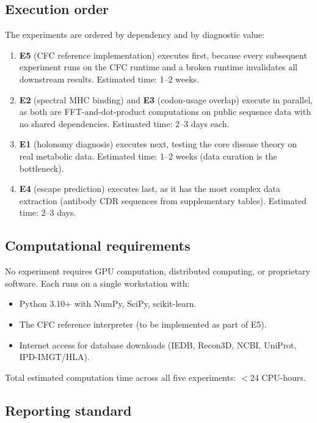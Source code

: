 \documentclass[11pt,a4paper]{article}
\theoremstyle{expthm}
\theoremstyle{definition}
\theoremstyle{remark}
\begin{document}
\subsection{Execution order}

The experiments are ordered by dependency and by diagnostic value:

\begin{enumerate}[leftmargin=1.4em,itemsep=3pt]
\item \textbf{E5} (CFC reference implementation) executes first, because
  every subsequent experiment runs on the CFC runtime and a broken
  runtime invalidates all downstream results. Estimated time: 1--2 weeks.
\item \textbf{E2} (spectral MHC binding) and \textbf{E3} (codon-usage
  overlap) execute in parallel, as both are FFT-and-dot-product
  computations on public sequence data with no shared dependencies.
  Estimated time: 2--3 days each.
\item \textbf{E1} (holonomy diagnosis) executes next, testing the core
  disease theory on real metabolic data. Estimated time: 1--2 weeks (data
  curation is the bottleneck).
\item \textbf{E4} (escape prediction) executes last, as it has the most
  complex data extraction (antibody CDR sequences from supplementary
  tables). Estimated time: 2--3 days.
\end{enumerate}

\subsection{Computational requirements}

No experiment requires GPU computation, distributed computing, or
proprietary software. Each runs on a single workstation with:
\begin{itemize}[leftmargin=1.4em,itemsep=1pt]
\item Python 3.10+ with NumPy, SciPy, scikit-learn.
\item The CFC reference interpreter (to be implemented as part of E5).
\item Internet access for database downloads (IEDB, Recon3D, NCBI,
  UniProt, IPD-IMGT/HLA).
\end{itemize}

Total estimated computation time across all five experiments:
$< 24$ CPU-hours.

\subsection{Reporting standard}
\end{document}

